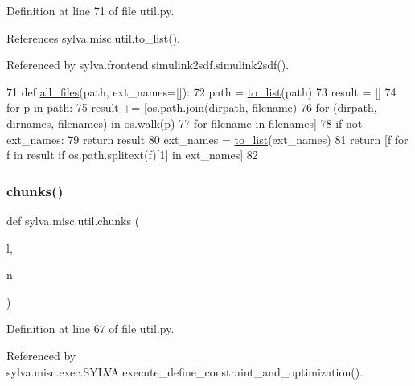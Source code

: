 Definition at line 71 of file util.\+py.



References sylva.\+misc.\+util.\+to\+\_\+list().



Referenced by sylva.\+frontend.\+simulink2sdf.\+simulink2sdf().


\begin{DoxyCode}
71 \textcolor{keyword}{def }\hyperlink{namespacesylva_1_1misc_1_1util_a5dfe1979a130725652883d277a24ee5d}{all\_files}(path, ext\_names=[]):
72     path = \hyperlink{namespacesylva_1_1misc_1_1util_a03f5cfd365a10a5ec0567e320f987a9b}{to\_list}(path)
73     result = []
74     \textcolor{keywordflow}{for} p \textcolor{keywordflow}{in} path:
75         result += [os.path.join(dirpath, filename)
76                    \textcolor{keywordflow}{for} (dirpath, dirnames, filenames) \textcolor{keywordflow}{in} os.walk(p)
77                    \textcolor{keywordflow}{for} filename \textcolor{keywordflow}{in} filenames]
78     \textcolor{keywordflow}{if} \textcolor{keywordflow}{not} ext\_names:
79         \textcolor{keywordflow}{return} result
80     ext\_names = \hyperlink{namespacesylva_1_1misc_1_1util_a03f5cfd365a10a5ec0567e320f987a9b}{to\_list}(ext\_names)
81     \textcolor{keywordflow}{return} [f \textcolor{keywordflow}{for} f \textcolor{keywordflow}{in} result \textcolor{keywordflow}{if} os.path.splitext(f)[1] \textcolor{keywordflow}{in} ext\_names]
82 
\end{DoxyCode}
\mbox{\label{namespacesylva_1_1misc_1_1util_aa202ba520fb5e2daa064c4379aeeb5cf}} 
\subsubsection{\texorpdfstring{chunks()}{chunks()}}
{\footnotesize\ttfamily def sylva.\+misc.\+util.\+chunks (\begin{DoxyParamCaption}\item[{}]{l,  }\item[{}]{n }\end{DoxyParamCaption})}



Definition at line 67 of file util.\+py.



Referenced by sylva.\+misc.\+exec.\+S\+Y\+L\+V\+A.\+execute\+\_\+define\+\_\+constraint\+\_\+and\+\_\+optimization().


